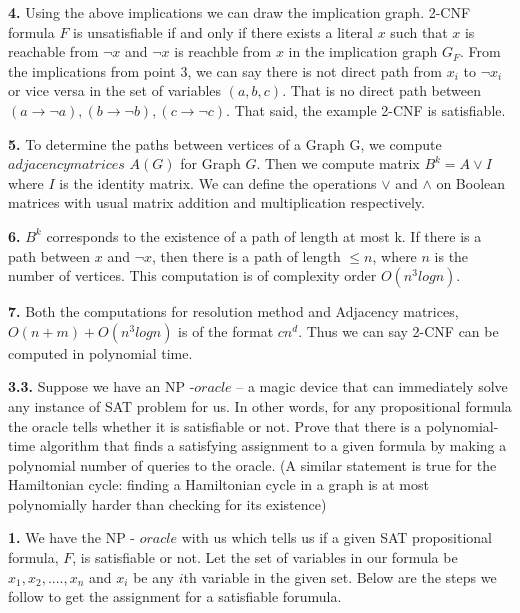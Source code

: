 \documentclass [12pt]{article}
\theoremstyle{definition}
\begin{document}
\phantom{1em} {\bf 4.} Using the above implications we can draw the implication graph. 2-CNF formula $F$ is unsatisfiable if and only if there exists a literal $x$ such that $x$ is reachable from $\neg x$ and $\neg x$ is reachble from $x$ in the implication graph $G_{F}$. From the implications from point 3, we can say there is not direct path from $x_{i}$ to $\neg x_{i}$ or vice versa in the set of variables $(a,b,c)$. That is no direct path between $(a \to \neg a), (b \to \neg b), (c \to \neg c)$. That said, the example 2-CNF is satisfiable. 

\phantom{1em} {\bf 5.} To determine the paths between vertices of a Graph G, we compute $adjacency matrices$ $A(G)$ for Graph $G$. Then we compute matrix $B^k = A \lor I$ where $I$ is the identity matrix.  We can define the operations $\lor$ and $\land$ on Boolean matrices with usual matrix addition and multiplication respectively. 

\phantom{1em} {\bf 6.} $B^k$ corresponds to the existence of a path of length at most k. If there is a path between $x$ and $\neg x$, then there is a path of length $\leqslant n$, where $n$ is the number of vertices. This computation is of complexity order $O(n^3 log n)$. 

\phantom{1em} {\bf 7.} Both the computations for resolution method and Adjacency matrices, $O(n + m) +  O(n^3 log n)$ is of the format $cn^d$. Thus we can say 2-CNF can be computed in polynomial time. 

\newpage

{\bf 3.3.} Suppose we have an NP -$oracle$ -- a magic device that can immediately solve any instance of SAT problem for us. In other words, for any propositional formula the oracle tells whether it is satisfiable or not. Prove that there is a polynomial-time algorithm that finds a satisfying assignment to a given formula by making a polynomial number of queries to the oracle. (A similar statement is true for the Hamiltonian cycle: finding a Hamiltonian cycle in a graph is at most polynomially harder than checking for its existence)

\phantom{1em} {\bf 1.} We have the NP - $oracle$ with us which tells us if a given SAT propositional formula, $F$, is satisfiable or not. Let the set of variables in our formula be $x_{1}, x_{2},...., x_{n}$ and $x_{i}$ be any $i$th variable in the  given set. Below are the steps we follow to get the assignment for a satisfiable forumula. 
\end{document}
